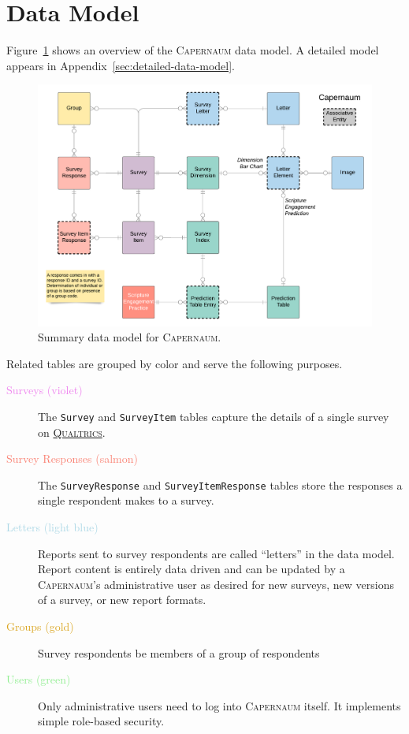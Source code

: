 \documentclass{article}
\newcommand{\caper}{\textsc{Capernaum}}
\newcommand{\qual}{\href{https://www.qualtrics.com/}{\textsc{Qualtrics}}}
\begin{document}
\section{Data Model}
\label{sec:data-model-overview}

Figure~\ref{fig:summary-data-model}
shows an overview of the \caper{} data model.
A detailed model appears in Appendix~\ref{sec:detailed-data-model}.
\begin{figure}
  \centering
  \includegraphics[width=\textwidth]{data-model-overview}
  \caption{Summary data model for \caper.}
  \label{fig:summary-data-model}
\end{figure}
Related tables are grouped by color
and serve the following purposes.
\begin{description}
\item[\textcolor{Violet}{Surveys (violet)}]
  The \texttt{Survey} and \texttt{SurveyItem} tables
  capture the details of a single survey on \qual.
\item[\textcolor{Salmon}{Survey Responses (salmon)}]
  The \texttt{SurveyResponse}
  and \texttt{SurveyItemResponse}
  tables store the responses a single respondent
  makes to a survey.
\item[\textcolor{LightBlue}{Letters (light blue)}]
  Reports sent to survey respondents are called ``letters'' in the data model.
  Report content is entirely data driven and can be updated by a \caper's administrative user
  as desired for new surveys, new versions of a survey, or new report formats.
\item[\textcolor{Goldenrod}{Groups (gold)}]
  Survey respondents be members of a group of respondents
\item[\textcolor{LightGreen}{Users (green)}]
  Only administrative users need to log into \caper{} itself.
  It implements simple role-based security.
\end{description}
\end{document}
